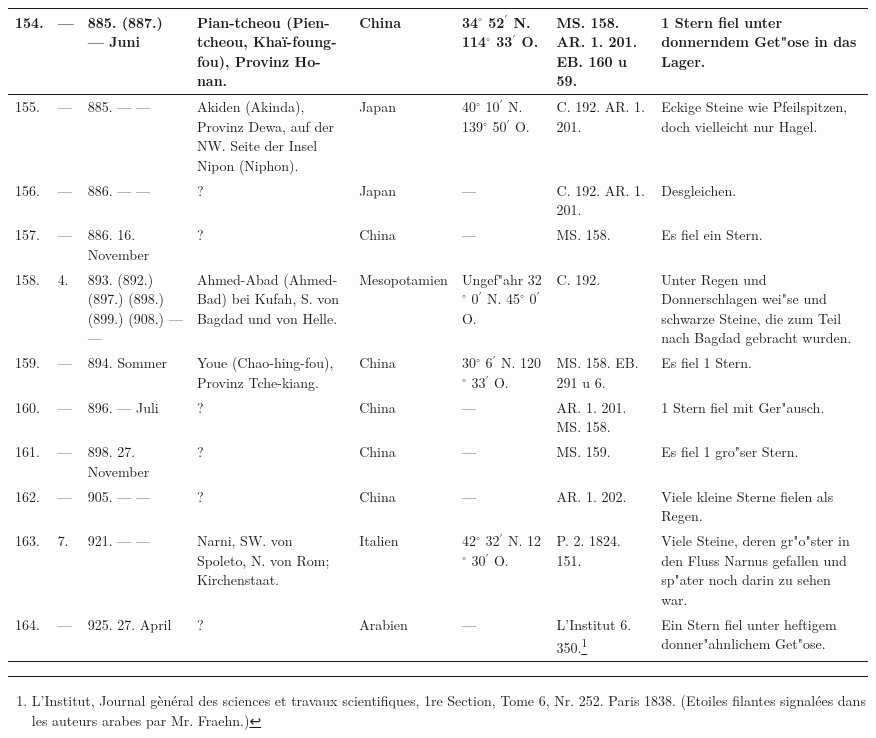 \documentclass[a4paper, 8pt, oneside, polutonikogreek, german]{article}
\begin{document}
\begin{center}
\begin{longtable}{| p{5mm} | p{3mm} | p{15mm} | p{25mm} | p{20mm} | p{14mm} | p{17mm} | p{24mm} |}
        154. & --- & 885. (887.) --- Juni & Pian-tcheou (Pien-tcheou, Khaï-foung-fou), Provinz Ho-nan. & China & 34$^\circ$ 52$^\prime$ N. 114$^\circ$ 33$^\prime$ O. & MS. 158. AR. 1. 201. EB. 160 u 59. & 1 Stern fiel unter donnerndem Get"ose in das Lager. \\ \hline
        155. & --- & 885. --- --- & Akiden (Akinda), Provinz Dewa, auf der NW. Seite der Insel Nipon (Niphon). & Japan & 40$^\circ$ 10$^\prime$ N. 139$^\circ$ 50$^\prime$ O. & C. 192. AR. 1. 201. & Eckige Steine wie Pfeilspitzen, doch vielleicht nur Hagel. \\ \hline
        156. & --- & 886. --- --- & ? & Japan & --- & C. 192. AR. 1. 201. & Desgleichen. \\ \hline
        157. & --- & 886. 16. November & ? & China & --- & MS. 158. & Es fiel ein Stern. \\ \hline
        158. & 4. & 893. (892.) (897.) (898.) (899.) (908.) --- --- & Ahmed-Abad (Ahmed-Bad) bei Kufah, S. von Bagdad und von Helle. & Mesopotamien & Ungef"ahr 32$^\circ$ 0$^\prime$ N. 45$^\circ$ 0$^\prime$ O. & C. 192. & Unter Regen und Donnerschlagen wei"se und schwarze Steine, die zum Teil nach Bagdad gebracht wurden. \\ \hline
        159. & --- & 894. Sommer & Youe (Chao-hing-fou), Provinz Tche-kiang. & China & 30$^\circ$ 6$^\prime$ N. 120$^\circ$ 33$^\prime$ O. & MS. 158. EB. 291 u 6. & Es fiel 1 Stern. \\ \hline
        160. & --- & 896. --- Juli & ? & China & --- & AR. 1. 201. MS. 158. & 1 Stern fiel mit Ger"ausch. \\ \hline
        161. & --- & 898. 27. November & ? & China & --- & MS. 159. & Es fiel 1 gro"ser Stern. \\ \hline
        162. & --- & 905. --- --- & ? & China & --- & AR. 1. 202. & Viele kleine Sterne fielen als Regen. \\ \hline
        163. & 7. & 921. --- --- & Narni, SW. von Spoleto, N. von Rom; Kirchenstaat. & Italien & 42$^\circ$ 32$^\prime$ N. 12$^\circ$ 30$^\prime$ O. & P. 2. 1824. 151. & Viele Steine, deren gr"o"ster in den Fluss Narnus gefallen und sp"ater noch darin zu sehen war. \\ \hline
        164. & --- & 925. 27. April & ? & Arabien & --- & L’Institut 6. 350.\footnote{L'Institut, Journal gènéral des sciences et travaux scientifiques, 1re Section, Tome 6, Nr. 252. Paris 1838. (Etoiles filantes signalées dans les auteurs arabes par Mr. Fraehn.)} & Ein Stern fiel unter heftigem donner"ahnlichem Get"ose. \\ \hline

\end{longtable}
\end{center}
\end{document}
